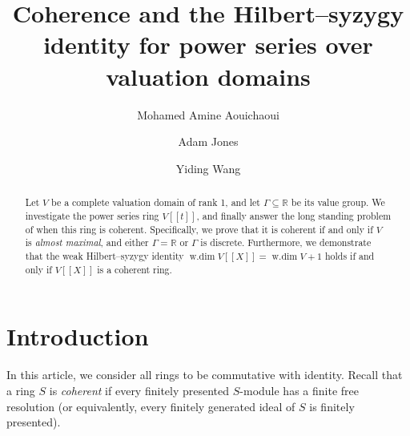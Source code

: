 \documentclass[12pt]{amsart}
\title[Weak Hilbert--syzygy equality]{Coherence and the Hilbert--syzygy identity for power series over valuation domains}
\author{Mohamed Amine Aouichaoui}
\author{Adam Jones}
\author{Yiding Wang}
\theoremstyle{plain}
\newcommand{\wdim}{\operatorname{w.dim}}
\begin{document}
\begin{abstract}
Let $V$ be a complete valuation domain of rank 1, and let $\Gamma\subseteq\mathbb{R}$ be its value group. We investigate the power series ring $V[[t]]$, and finally answer the long standing problem of when this ring is coherent. Specifically, we prove that it is coherent if and only if $V$ is \emph{almost maximal}, and either $\Gamma=\mathbb{R}$ or $\Gamma$ is discrete. Furthermore, we demonstrate that the weak Hilbert--syzygy identity $\wdim V[[X]]=\wdim V+1$ holds if and only if $V[[X]]$ is a coherent ring.%
\end{abstract}

\maketitle

\section{Introduction}

\noindent In this article, we consider all rings to be commutative with identity. Recall that a ring $S$ is \emph{coherent} if every finitely presented $S$-module has a finite free resolution (or equivalently, every finitely generated ideal of $S$ is finitely presented). 
\end{document}
